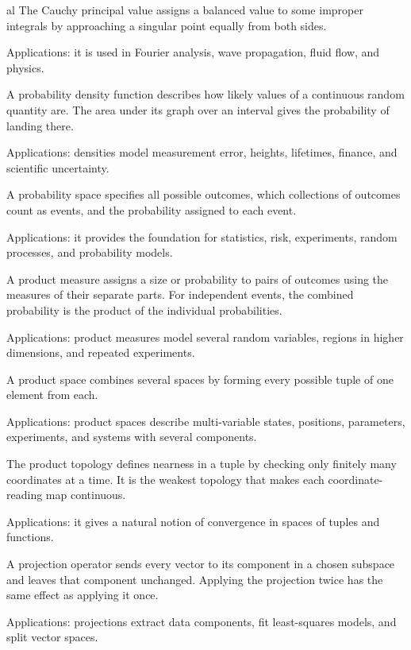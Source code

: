 al
The Cauchy principal value assigns a balanced value to some improper integrals by approaching a singular point equally from both sides. \par\noindent Applications: it is used in Fourier analysis, wave propagation, fluid flow, and physics.

A probability density function describes how likely values of a continuous random quantity are. The area under its graph over an interval gives the probability of landing there. \par\noindent Applications: densities model measurement error, heights, lifetimes, finance, and scientific uncertainty.

A probability space specifies all possible outcomes, which collections of outcomes count as events, and the probability assigned to each event. \par\noindent Applications: it provides the foundation for statistics, risk, experiments, random processes, and probability models.

A product measure assigns a size or probability to pairs of outcomes using the measures of their separate parts. For independent events, the combined probability is the product of the individual probabilities. \par\noindent Applications: product measures model several random variables, regions in higher dimensions, and repeated experiments.

A product space combines several spaces by forming every possible tuple of one element from each. \par\noindent Applications: product spaces describe multi-variable states, positions, parameters, experiments, and systems with several components.

The product topology defines nearness in a tuple by checking only finitely many coordinates at a time. It is the weakest topology that makes each coordinate-reading map continuous. \par\noindent Applications: it gives a natural notion of convergence in spaces of tuples and functions.

A projection operator sends every vector to its component in a chosen subspace and leaves that component unchanged. Applying the projection twice has the same effect as applying it once. \par\noindent Applications: projections extract data components, fit least-squares models, and split vector spaces.

